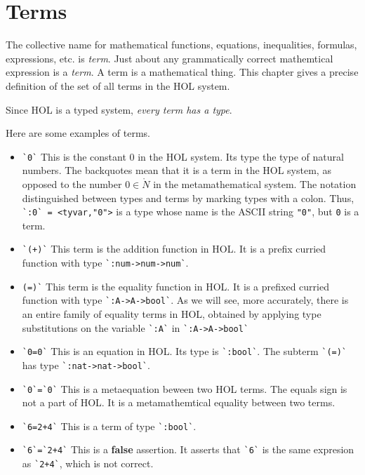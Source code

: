 \chapter{Terms}

The collective name for mathematical functions, equations, inequalities, formulas, expressions, etc. is {\it term}.  Just about any grammatically correct mathemtical expression is a {\it term}.  A term is a mathematical thing.  This chapter gives a precise definition of the set of all terms in the HOL system.

Since HOL is a typed system, {\it every term has a type}.

\begin{example}
Here are some examples of terms.
\begin{itemize}
\item \verb!`0`!  This is the constant $0$ in the HOL system.  Its type the type of natural numbers.  The backquotes mean that it is a term in the HOL system, as opposed to the number $0\in\ring{N}$ in the metamathematical system.  The notation distinguished between types and terms by marking types with a colon.  Thus, \verb!`:0` = <tyvar,"0">! is a type whose name is the ASCII string \verb!"0"!, but \verb`0` is a term.
%
\item \verb!`(+)`!  This term is the addition function in HOL.  It is a prefix curried function with type \verb!`:num->num->num`!.
%
\item \verb!(=)`!  This term is the equality function in HOL.  It is a prefixed curried function with type \verb!`:A->A->bool`!.  As we will see, more accurately, there is an entire family of equality terms in HOL, obtained by applying type substitutions on the variable \verb!`:A`! in \verb!`:A->A->bool`!
%
\item \verb!`0=0`!  This is an equation in HOL.  Its type is \verb!`:bool`!.  The subterm \verb!`(=)`! has type \verb!`:nat->nat->bool`!.
%
\item \verb!`0`=`0`!  This is a metaequation beween two HOL terms.  The equals sign is not a part of HOL.  It is a metamathemtical equality between two terms.
%
\item \verb!`6=2+4`!  This is a term of type \verb!`:bool`!.
%
\item \verb!`6`=`2+4`!  This is a {\bf false} assertion.  It asserts that \verb!`6`! is the same expresion as \verb!`2+4`!, which is not correct.  
\end{itemize}
\end{example}

